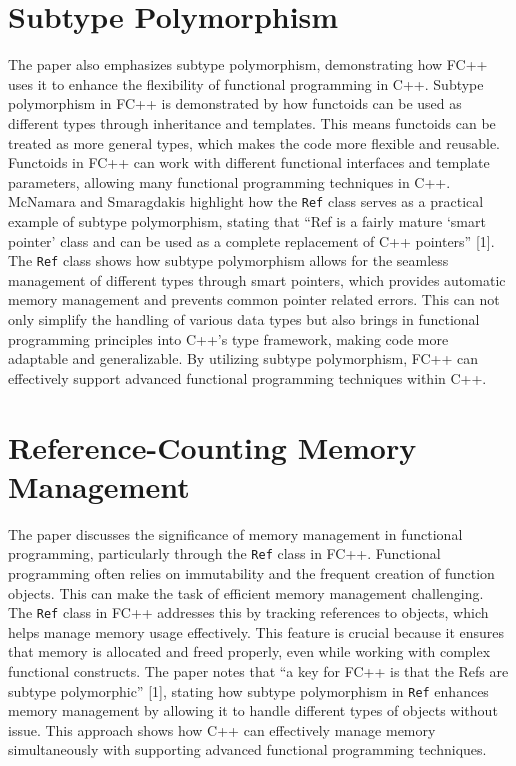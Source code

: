 \documentclass[12pt]{article}
\begin{document}
\section{Subtype Polymorphism}
The paper also emphasizes subtype polymorphism, demonstrating how FC++ uses it to enhance the flexibility of functional programming in C++. Subtype polymorphism in FC++ is demonstrated by how functoids can be used as different types through inheritance and templates. This means functoids can be treated as more general types, which makes the code more flexible and reusable. Functoids in FC++ can work with different functional interfaces and template parameters, allowing many functional programming techniques in C++. McNamara and Smaragdakis highlight how the \texttt{Ref} class serves as a practical example of subtype polymorphism, stating that ``Ref is a fairly mature `smart pointer' class and can be used as a complete replacement of C++ pointers'' [1]. The \texttt{Ref} class shows how subtype polymorphism allows for the seamless management of different types through smart pointers, which provides automatic memory management and prevents common pointer related errors. This can not only simplify the handling of various data types but also brings in functional programming principles into C++’s type framework, making code more adaptable and generalizable. By utilizing subtype polymorphism, FC++ can effectively support advanced functional programming techniques within C++.

\section{Reference-Counting Memory Management}
The paper discusses the significance of memory management in functional programming, particularly through the \texttt{Ref} class in FC++. Functional programming often relies on immutability and the frequent creation of function objects. This can make the task of efficient memory management challenging. The \texttt{Ref} class in FC++ addresses this by tracking references to objects, which helps manage memory usage effectively. This feature is crucial because it ensures that memory is allocated and freed properly, even while working with complex functional constructs. The paper notes that ``a key for FC++ is that the Refs are subtype polymorphic'' [1], stating how subtype polymorphism in \texttt{Ref} enhances memory management by allowing it to handle different types of objects without issue. This approach shows how C++ can effectively manage memory simultaneously with supporting advanced functional programming techniques.
\end{document}
